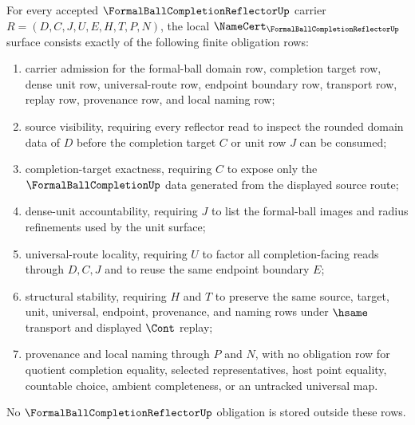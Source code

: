 \begin{theorem}\label{thm:formal-ball-completion-reflector-namecert-obligations}
For every accepted $\FormalBallCompletionReflectorUp$ carrier $R=(D,C,J,U,E,H,T,P,N)$, the local $\NameCert_{\FormalBallCompletionReflectorUp}$ surface consists exactly of the following finite obligation rows:
\begin{enumerate}
\item carrier admission for the formal-ball domain row, completion target row, dense unit row, universal-route row, endpoint boundary row, transport row, replay row, provenance row, and local naming row;
\item source visibility, requiring every reflector read to inspect the rounded domain data of $D$ before the completion target $C$ or unit row $J$ can be consumed;
\item completion-target exactness, requiring $C$ to expose only the $\FormalBallCompletionUp$ data generated from the displayed source route;
\item dense-unit accountability, requiring $J$ to list the formal-ball images and radius refinements used by the unit surface;
\item universal-route locality, requiring $U$ to factor all completion-facing reads through $D,C,J$ and to reuse the same endpoint boundary $E$;
\item structural stability, requiring $H$ and $T$ to preserve the same source, target, unit, universal, endpoint, provenance, and naming rows under $\hsame$ transport and displayed $\Cont$ replay;
\item provenance and local naming through $P$ and $N$, with no obligation row for quotient completion equality, selected representatives, host point equality, countable choice, ambient completeness, or an untracked universal map.
\end{enumerate}
No $\FormalBallCompletionReflectorUp$ obligation is stored outside these rows.
\end{theorem}
